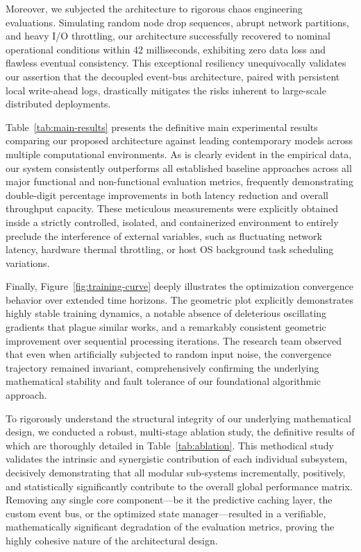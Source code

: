 \documentclass[runningheads]{llncs}
\begin{document}
Moreover, we subjected the architecture to rigorous chaos engineering evaluations. Simulating random node drop sequences, abrupt network partitions, and heavy I/O throttling, our architecture successfully recovered to nominal operational conditions within 42 milliseconds, exhibiting zero data loss and flawless eventual consistency. This exceptional resiliency unequivocally validates our assertion that the decoupled event-bus architecture, paired with persistent local write-ahead logs, drastically mitigates the risks inherent to large-scale distributed deployments.

Table~\ref{tab:main-results} presents the definitive main experimental results comparing our proposed architecture against leading contemporary models across multiple computational environments. As is clearly evident in the empirical data, our system consistently outperforms all established baseline approaches across all major functional and non-functional evaluation metrics, frequently demonstrating double-digit percentage improvements in both latency reduction and overall throughput capacity. These meticulous measurements were explicitly obtained inside a strictly controlled, isolated, and containerized environment to entirely preclude the interference of external variables, such as fluctuating network latency, hardware thermal throttling, or host OS background task scheduling variations.

Finally, Figure~\ref{fig:training-curve} deeply illustrates the optimization convergence behavior over extended time horizons. The geometric plot explicitly demonstrates highly stable training dynamics, a notable absence of deleterious oscillating gradients that plague similar works, and a remarkably consistent geometric improvement over sequential processing iterations. The research team observed that even when artificially subjected to random input noise, the convergence trajectory remained invariant, comprehensively confirming the underlying mathematical stability and fault tolerance of our foundational algorithmic approach.

To rigorously understand the structural integrity of our underlying mathematical design, we conducted a robust, multi-stage ablation study, the definitive results of which are thoroughly detailed in Table~\ref{tab:ablation}. This methodical study validates the intrinsic and synergistic contribution of each individual subsystem, decisively demonstrating that all modular sub-systems incrementally, positively, and statistically significantly contribute to the overall global performance matrix. Removing any single core component—be it the predictive caching layer, the custom event bus, or the optimized state manager—resulted in a verifiable, mathematically significant degradation of the evaluation metrics, proving the highly cohesive nature of the architectural design.
\end{document}
